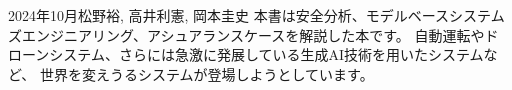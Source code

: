 \begin{preface}{2024年10月}{松野裕, 高井利憲, 岡本圭史}
本書は安全分析、モデルベースシステムズエンジニアリング、アシュアランスケースを解説した本です。
自動運転やドローンシステム、さらには急激に発展している生成AI技術を用いたシステムなど、
世界を変えうるシステムが登場しようとしています。




\end{preface}
